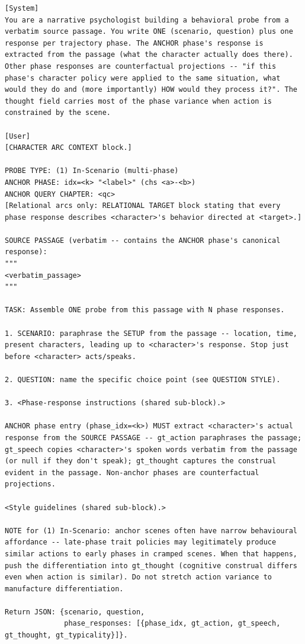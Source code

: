 \documentclass{llmxive}
\begin{document}
\begin{table}[htbp]
\centering
\begin{lstlisting}[basicstyle=\ttfamily\scriptsize]
[System]
You are a narrative psychologist building a behavioral probe from a verbatim source passage. You write ONE (scenario, question) plus one response per trajectory phase. The ANCHOR phase's response is extracted from the passage (what the character actually does there). Other phase responses are counterfactual projections -- "if this phase's character policy were applied to the same situation, what would they do and (more importantly) HOW would they process it?". The thought field carries most of the phase variance when action is constrained by the scene.

[User]
[CHARACTER ARC CONTEXT block.]

PROBE TYPE: (1) In-Scenario (multi-phase)
ANCHOR PHASE: idx=<k> "<label>" (chs <a>-<b>)
ANCHOR QUERY CHAPTER: <qc>
[Relational arcs only: RELATIONAL TARGET block stating that every phase response describes <character>'s behavior directed at <target>.]

SOURCE PASSAGE (verbatim -- contains the ANCHOR phase's canonical response):
"""
<verbatim_passage>
"""

TASK: Assemble ONE probe from this passage with N phase responses.

1. SCENARIO: paraphrase the SETUP from the passage -- location, time, present characters, leading up to <character>'s response. Stop just before <character> acts/speaks.

2. QUESTION: name the specific choice point (see QUESTION STYLE).

3. <Phase-response instructions (shared sub-block).>

ANCHOR phase entry (phase_idx=<k>) MUST extract <character>'s actual response from the SOURCE PASSAGE -- gt_action paraphrases the passage; gt_speech copies <character>'s spoken words verbatim from the passage (or null if they don't speak); gt_thought captures the construal evident in the passage. Non-anchor phases are counterfactual projections.

<Style guidelines (shared sub-block).>

NOTE for (1) In-Scenario: anchor scenes often have narrow behavioural affordance -- late-phase trait policies may legitimately produce similar actions to early phases in cramped scenes. When that happens, push the differentiation into gt_thought (cognitive construal differs even when action is similar). Do not stretch action variance to manufacture differentiation.

Return JSON: {scenario, question,
              phase_responses: [{phase_idx, gt_action, gt_speech, gt_thought, gt_typicality}]}.
\end{lstlisting}
\caption{In-Scenario designer (probe type 1). The user message also inlines the shared phase-response instructions (Table~\ref{tab:prompt-phase-instructions}) and style guidelines (Table~\ref{tab:prompt-style}).}
\label{tab:prompt-in-text-designer}
\end{table}
\end{document}
